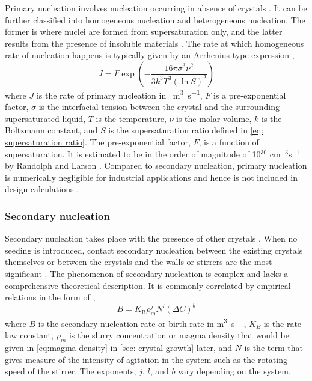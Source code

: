 Primary nucleation involves nucleation occurring in absence of crystals \cite{seader_separation_2011}. It can be further classified into homogeneous nucleation and heterogeneous nucleation. The former is where nuclei are formed from supersaturation only, and the latter results from the presence of insoluble materials \cite{richardson_chemical_2006}. The rate at which homogeneous rate of nucleation happens is typically given by an Arrhenius-type expression \cite{richardson_chemical_2006},
\begin{equation}
     J = F\exp\left(-\frac{16 \pi \sigma^3 \nu^2}{3 k^3 T^3 (\ln S)^2}\right)
\end{equation}
where $J$ is the rate of primary nucleation in \si{\per\cubic\m\per\s}, $F$ is a pre-exponential factor, $\sigma$ is the interfacial tension between the crystal and the surrounding supersaturated liquid, $T$ is the temperature, $\nu$ is the molar volume, $k$ is the Boltzmann constant, and $S$ is the supersaturation ratio defined in \cref{eq: supersaturation ratio}. The pre-exponential factor, $F$, is a function of supersaturation. It is estimated to be in the order of magnitude of 10$^{30}$ cm$^{-3}$s$^{-1}$ by Randolph and Larson \cite{randolph_theory_1971}. Compared to secondary nucleation, primary nucleation is numerically negligible for industrial applications and hence is not included in design calculations \cite{randolph_theory_1971}. 

\subsubsection{Secondary nucleation}\label{sec:secondary nucleation}

Secondary nucleation takes place with the presence of other crystals \cite{richardson_chemical_2006}. When no seeding is introduced, contact secondary nucleation between the existing crystals themselves or between the crystals and the walls or stirrers are the most significant \cite{richardson_chemical_2006}. The phenomenon of secondary nucleation is complex and lacks a comprehensive theoretical description. It is commonly correlated by empirical relations in the form of \cite{seader_separation_2011},
\begin{equation} \label{eq:secondary nucleation general}
    B = K_{\mathrm{B}} \rho^j_{\mathrm{m}} N^l (\Delta C)^b 
\end{equation}
where $B$ is the secondary nucleation rate or birth rate in \si{\cubic\m\per\s}, $K_B$ is the rate law constant, $\rho_m$ is the slurry concentration or magma density that would be given in \cref{eq:magma density} in \cref{sec: crystal growth} later, and $N$ is the term that gives measure of the intensity of agitation in the system such as the rotating speed of the stirrer. The exponents, $j$, $l$, and $b$ vary depending on the system.

